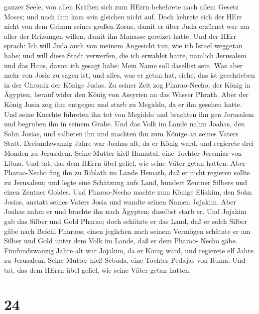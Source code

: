 ganzer Seele, von allen Kräften sich zum HErrn bekehrete nach allem
Gesetz Moses; und nach ihm kam sein gleichen nicht auf. 
Doch kehrete sich der HErr nicht von dem Grimm seines großen Zorns,
damit er über Juda erzürnet war um aller der Reizungen willen, damit ihn
Manasse gereizet hatte.  Und der HErr sprach: Ich will Juda
auch von meinem Angesicht tun, wie ich Israel weggetan habe; und will
diese Stadt verwerfen, die ich erwählet hatte, nämlich Jerusalem und das
Haus, davon ich gesagt habe: Mein Name soll daselbst sein. 
Was aber mehr von Josia zu sagen ist, und alles, was er getan hat,
siehe, das ist geschrieben in der Chronik der Könige Judas.
 Zu seiner Zeit zog Pharao-Necho, der König in Ägypten,
herauf wider den König von Assyrien an das Wasser Phrath. Aber der König
Josia zog ihm entgegen und starb zu Megiddo, da er ihn gesehen hatte.
 Und seine Knechte führeten ihn tot von Megiddo und
brachten ihn gen Jerusalem und begruben ihn in seinem Grabe. Und das
Volk im Lande nahm Joahas, den Sohn Josias, und salbeten ihn und machten
ihn zum Könige an seines Vaters Statt.  Dreiundzwanzig
Jahre war Joahas alt, da er König ward, und regierete drei Monden zu
Jerusalem. Seine Mutter hieß Hamutal, eine Tochter Jeremias von Libna.
 Und tat, das dem HErrn übel gefiel, wie seine Väter getan
hatten.  Aber Pharao-Necho fing ihn zu Riblath im Lande
Hemath, daß er nicht regieren sollte zu Jerusalem; und legte eine
Schätzung aufs Land, hundert Zentner Silbers und einen Zentner Goldes.
 Und Pharao-Necho machte zum Könige Eliakim, den Sohn
Josias, anstatt seines Vaters Josia und wandte seinen Namen Jojakim.
Aber Joahas nahm er und brachte ihn nach Ägypten; daselbst starb er.
 Und Jojakim gab das Silber und Gold Pharao; doch schätzte
er das Land, daß er solch Silber gäbe nach Befehl Pharaos; einen
jeglichen nach seinem Vermögen schätzte er am Silber und Gold unter dem
Volk im Lande, daß er dem Pharao- Necho gäbe. 
Fünfundzwanzig Jahre alt war Jojakim, da er König ward, und regierete
elf Jahre zu Jerusalem. Seine Mutter hieß Sebuda, eine Tochter Pedajas
von Ruma.  Und tat, das dem HErrn übel gefiel, wie seine
Väter getan hatten.

\hypertarget{section-23}{%
\section{24}\label{section-23}}

